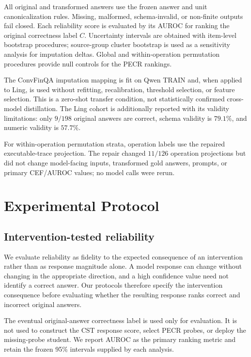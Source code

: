\documentclass[11pt]{article}
\begin{document}
All original and transformed answers use the frozen answer and unit canonicalization rules. Missing, malformed, schema-invalid, or non-finite outputs fail closed. Each reliability score is evaluated by its AUROC for ranking the original correctness label \(C\). Uncertainty intervals are obtained with item-level bootstrap procedures; source-group cluster bootstrap is used as a sensitivity analysis for imputation deltas. Global and within-operation permutation procedures provide null controls for the PECR rankings.

The ConvFinQA imputation mapping is fit on Qwen TRAIN and, when applied to Ling, is used without refitting, recalibration, threshold selection, or feature selection. This is a zero-shot transfer condition, not statistically confirmed cross-model distillation. The Ling cohort is additionally reported with its validity limitations: only \(9/198\) original answers are correct, schema validity is \(79.1\%\), and numeric validity is \(57.7\%\).

For within-operation permutation strata, operation labels use the repaired executable-trace projection. The repair changed \(11/126\) operation projections but did not change model-facing inputs, transformed gold answers, prompts, or primary CEF/AUROC values; no model calls were rerun.

\section{Experimental Protocol}

\subsection{Intervention-tested reliability}

We evaluate reliability as fidelity to the expected consequence of an intervention rather than as response magnitude alone. A model response can change without changing in the appropriate direction, and a high confidence value need not identify a correct answer. Our protocols therefore specify the intervention consequence before evaluating whether the resulting response ranks correct and incorrect original answers.

The eventual original-answer correctness label is used only for evaluation. It is not used to construct the CST response score, select PECR probes, or deploy the missing-probe student. We report AUROC as the primary ranking metric and retain the frozen 95\% intervals supplied by each analysis.
\end{document}
